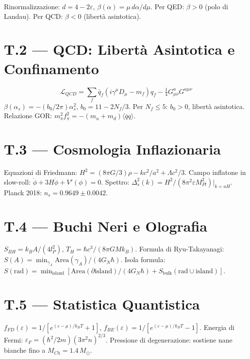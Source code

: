 \documentclass[11.5pt,a4paper,openany]{book}
\theoremstyle{remark}
\begin{document}
Rinormalizzazione: $d = 4-2\varepsilon$, $\beta(\alpha) = \mu\,d\alpha/d\mu$. Per QED: $\beta > 0$ (polo di Landau). Per QCD: $\beta < 0$ (libertà asintotica).

\chapter*{T.2 --- QCD: Libertà Asintotica e Confinamento}

\[
\mathcal{L}_{QCD} = \sum_f \bar{q}_f(i\gamma^\mu D_\mu - m_f)q_f - \tfrac{1}{4}G^a_{\mu\nu}G^{a\mu\nu}
\]
$\beta(\alpha_s) = -(b_0/2\pi)\alpha_s^2$, $b_0 = 11 - 2N_f/3$. Per $N_f \leq 5$: $b_0 > 0$, libertà asintotica. Relazione GOR: $m_\pi^2 f_\pi^2 = -(m_u+m_d)\langle\bar{q}q\rangle$.

\chapter*{T.3 --- Cosmologia Inflazionaria}

Equazioni di Friedmann:
$H^2 = (8\pi G/3)\rho - kc^2/a^2 + \Lambda c^2/3$.
Campo inflatone in slow-roll: $\ddot{\phi}+3H\dot{\phi}+V'(\phi)=0$.
Spettro: $\Delta^2_s(k) = H^2/(8\pi^2\varepsilon M_{Pl}^2)|_{k=aH}$.
Planck 2018: $n_s = 0.9649\pm0.0042$.

\chapter*{T.4 --- Buchi Neri e Olografia}

$S_{BH} = k_B A/(4l_P^2)$, $T_H = \hbar c^3/(8\pi GMk_B)$.
Formula di Ryu-Takayanagi: $S(A) = \min_{\gamma_A}\mathrm{Area}(\gamma_A)/(4G_N\hbar)$.
Isola formula: $S(\text{rad}) = \min_\text{island}[\mathrm{Area}(\partial\text{island})/(4G_N\hbar) + S_\text{bulk}(\text{rad}\cup\text{island})]$.

\chapter*{T.5 --- Statistica Quantistica}

$f_{FD}(\varepsilon) = 1/[e^{(\varepsilon-\mu)/k_BT}+1]$, $f_{BE}(\varepsilon) = 1/[e^{(\varepsilon-\mu)/k_BT}-1]$.
Energia di Fermi: $\varepsilon_F = (\hbar^2/2m)(3\pi^2 n)^{2/3}$.
Pressione di degenerazione: sostiene nane bianche fino a $M_{Ch} = 1.4\,M_\odot$.
\end{document}

